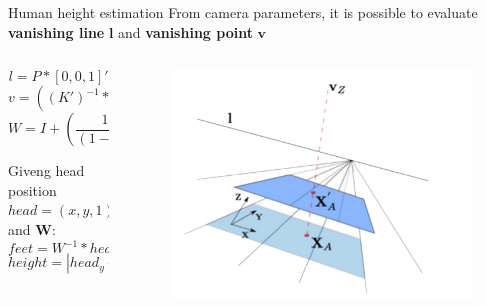 \documentclass{beamer}
\begin{document}
\begin{tframe}{Human height estimation}
From camera parameters, it is possible to evaluate \textbf{vanishing line} $\textbf{l}$ and \textbf{vanishing point} $\textbf{v}$


\begin{columns}[t] %
\begin{column}{.45\textwidth}
$$l = P * [0, 0, 1]'$$
$$v = ((K')^{-1} * K^{-1}) * l$$
$$W = I + (\frac{1}{(1 - \mu)} - 1) * \frac{v * l'}{v' * l}$$

\vspace{0.2cm}
Giveng head position $head = (x, y, 1)$ and $\textbf{W}$:
$$feet = W^{-1} * head$$
$$height = |head_y - feet_y|$$

\end{column}%
\begin{column}{.5\textwidth}
\begin{figure}[h]
\centering
\includegraphics[width=1.1\textwidth]{images/height_calib.jpg}
\end{figure}
\end{column}%
\end{columns}


\end{tframe}
\end{document}
